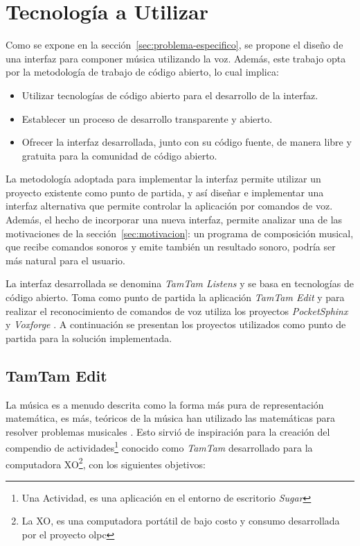 
\section{Tecnolog\'ia a Utilizar}
\label{sec:tecnologia-utilizada}

Como se expone en la secci\'on~\ref{sec:problema-especifico}, se propone el dise\~no
de una interfaz para componer m\'usica utilizando la voz. Adem\'as, este trabajo 
opta por la metodolog\'ia de trabajo
de c\'odigo abierto, lo cual implica: 

\begin{itemize}
    \item Utilizar tecnolog\'ias de c\'odigo abierto para el desarrollo de la interfaz.
    \item Establecer un proceso de desarrollo transparente y abierto.
    \item Ofrecer la interfaz desarrollada, junto con su c\'odigo fuente, de manera libre 
        y gratuita para la comunidad de c\'odigo abierto.
\end{itemize}

La metodolog\'ia adoptada para implementar la interfaz permite utilizar un proyecto
existente como punto de partida, y as\'i dise\~nar e implementar una interfaz alternativa que permite
controlar la aplicaci\'on por comandos de voz. Adem\'as,
el hecho de incorporar una nueva interfaz, permite analizar
una de las motivaciones de la secci\'on~\ref{sec:motivacion}: un programa de composici\'on
musical, que recibe comandos sonoros y emite tambi\'en un resultado sonoro, podr\'ia ser
m\'as natural para el usuario. 

La interfaz desarrollada se denomina \emph{TamTam Listens} y se basa en tecnolog\'ias de c\'odigo abierto.
Toma como punto de partida la aplicaci\'on \emph{TamTam Edit} y para realizar el reconocimiento de comandos
de voz utiliza los proyectos \emph{PocketSphinx} \cite{PocketSphinxHomePage} 
y \emph{Voxforge} \cite{Voxforge}.  A continuaci\'on se presentan los proyectos
utilizados como punto de partida para la soluci\'on implementada.

\subsection{TamTam Edit}
\label{sec:tamtam-edit}

La m\'usica es a menudo descrita como la forma m\'as pura de representaci\'on matem\'atica, es m\'as,
te\'oricos de la m\'usica han utilizado las matem\'aticas para resolver problemas musicales
\cite{TheSoundOfNumbers}. Esto sirvi\'o de inspiraci\'on para la creaci\'on del compendio de 
actividades\footnote{Una Actividad, es una aplicaci\'on en el entorno de escritorio \emph{Sugar}}
conocido como \emph{TamTam} desarrollado para la computadora XO\footnote{La XO, es una computadora 
port\'atil de bajo costo y consumo desarrollada por el proyecto \gls{olpc}},
con los siguientes objetivos:

